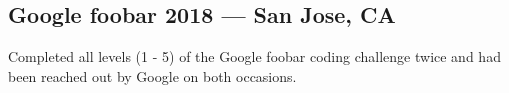 \documentclass[../Resume.tex]{subfiles}
\begin{document}
	\subsection{Google foobar \null\hfill 2018 --- San Jose, CA}
	\par Completed all levels (1 - 5) of the Google foobar coding challenge twice and had been reached out by Google on both occasions.
\end{document}
